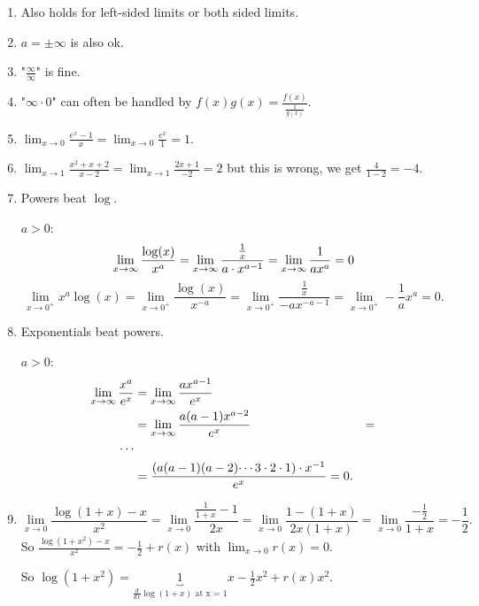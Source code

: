 \documentclass[10pt, a4paper]{article}
\begin{document}
\begin{remark}
    \begin{enumerate}[label = (\roman*)]
        \item Also holds for left-sided limits or both sided limits.

        \item $a = \pm\infty$ is also ok.

        \item "$\frac{\infty}{\infty}$" is fine.

        \item "$\infty \cdot 0$" can often be handled by $f(x)g(x) = \frac{f(x)}{\frac{1}{g(x)}}$.

        \item $\lim_{x \rightarrow 0}\frac{e ^ x - 1}{x} = \lim_{x \rightarrow 0}\frac{e ^ x}{1} = 1$.

        \item $\lim_{x \rightarrow 1}\frac{x ^ 2 + x + 2}{x - 2} = \lim_{x \rightarrow 1}\frac{2x + 1}{-2} = 2$ but this is wrong,
        we get $\frac{4}{1 - 2} = -4$.

        \item Powers beat $\log$.
        
        $a > 0$:
        \[
        \liminfty[x]\frac{\log(x)}{x ^ a} = \liminfty[x]\frac{\frac{1}{x}}{a \cdot x ^ {a - 1}} = \liminfty[x]\frac{1}{ax ^ a} = 0
        \]
        \[
        \lim_{x \rightarrow 0 ^ {+}}x ^ a\log(x) = \lim_{x \rightarrow 0 ^ {+}}\frac{\log(x)}{x ^ {-a}} = \lim_{x \rightarrow 0 ^ {+}}\frac{\frac{1}{x}}{-ax ^ {-a - 1}} = \lim_{x \rightarrow 0 ^ {+}}-\frac{1}{a}x ^ a = 0.
        \]

        \item Exponentials beat powers.
        
        $a > 0$:
        \begin{align*}
            \liminfty[x]\frac{x ^ a}{e ^ x} &= \liminfty[x]\frac{ax ^ {a - 1}}{e ^ x} \\
            &= \liminfty[x]\frac{a(a - 1)x ^ {a - 2}}{e ^ x} &= \\
            \dotsi \\
            &= \frac{(a(a - 1)(a - 2)\dotsi 3 \cdot 2 \cdot 1) \cdot x ^ {-1}}{e ^ x} = 0.
        \end{align*}

        \item
        \[
        \lim_{x \rightarrow 0}\frac{\log(1 + x) - x}{x ^ 2} = \lim_{x \rightarrow 0}\frac{\frac{1}{1 + x} - 1}{2x} = \lim_{x \rightarrow 0}\frac{1 - (1 + x)}{2x(1 + x)} = \lim_{x \rightarrow 0}\frac{-\frac{1}{2}}{1 + x} = -\frac{1}{2}.
        \]
        So $\frac{\log(1 + x ^ 2) - x}{x ^ 2} = -\frac{1}{2} + r(x)$ with $\lim_{x \rightarrow 0}r(x) = 0$.

        So $\log(1 + x ^ 2) = \underbrace{1}_{\frac{d}{dx}\log(1 + x)\text{ at x = 1}}x - \frac{1}{2}x ^ 2 + r(x)x ^ 2$.
    \end{enumerate}
\end{remark}
\end{document}
